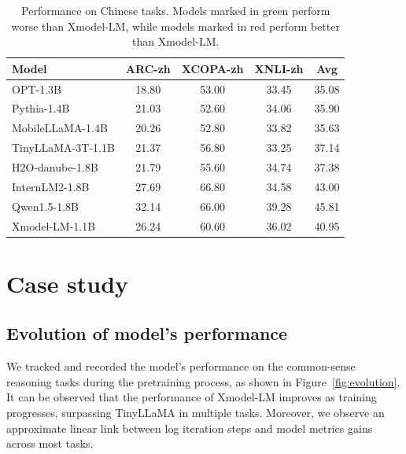 \documentclass{article}
\newcommand{\llm}{Xmodel-LM\xspace}
\begin{document}
\begin{table}[ht]
  \centering
  \setlength{\tabcolsep}{15pt}
  \begin{tabular}{lcccc}
    \toprule
    Model & \textbf{ARC-zh} & \textbf{XCOPA-zh} & \textbf{XNLI-zh}& \textbf{Avg}\\
    \midrule
    \rowcolor{darkgreen!20}
    OPT-1.3B\xspace   &18.80&53.00&33.45&35.08 \\
    \rowcolor{darkgreen!20}
    Pythia-1.4B\xspace   &21.03&52.60&34.06&35.90 \\
    \rowcolor{darkgreen!20}
    MobileLLaMA-1.4B\xspace   &20.26&52.80&33.82&35.63 \\
    \rowcolor{darkgreen!20}
    TinyLLaMA-3T-1.1B\xspace   &21.37&56.80&33.25&37.14 \\
    \rowcolor{darkgreen!20}
    H2O-danube-1.8B\xspace  &21.79&55.60&34.74&37.38 \\
    \rowcolor{darkred!20}
    InternLM2-1.8B\xspace   &27.69&66.80&34.58&43.00 \\
    \rowcolor{darkred!20}
    Qwen1.5-1.8B\xspace &32.14&66.00&39.28&45.81 \\
    \midrule
    \rowcolor{xdcolor!20}
    \llm-1.1B\xspace    &26.24&60.60&36.02&40.95 \\
    \bottomrule
  \end{tabular}
  \newline
  \caption{Performance on Chinese tasks. Models marked in green perform worse than \llm, while models marked in red perform better than \llm.}
  \label{tab: chinese}
\end{table}


\section{Case study}
\label{sec:case study}

\subsection{Evolution of model's performance}

We tracked and recorded the model's performance on the common-sense reasoning tasks during the pretraining process, as shown in Figure~\ref{fig:evolution}. It can be observed that the performance of \llm improves as training progresses, surpassing TinyLLaMA in multiple tasks. Moreover, we observe an approximate linear link between log iteration steps and model metrics gains across most tasks.
\end{document}
